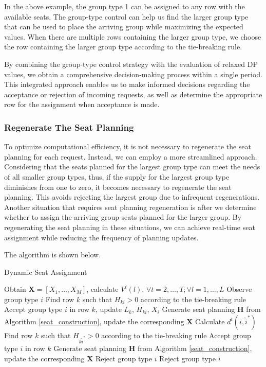 In the above example, the group type 1 can be assigned to any row with the available seats. The group-type control can help us find the larger group type that can be used to place the arriving group while maximizing the expected values. When there are multiple rows containing the larger group type, we choose the row containing the larger group type according to the tie-breaking rule.

By combining the group-type control strategy with the evaluation of relaxed DP values, we obtain a comprehensive decision-making process within a single period. This integrated approach enables us to make informed decisions regarding the acceptance or rejection of incoming requests, as well as determine the appropriate row for the assignment when acceptance is made.

\subsubsection{Regenerate The Seat Planning}
To optimize computational efficiency, it is not necessary to regenerate the seat planning for each request. Instead, we can employ a more streamlined approach. Considering that the seats planned for the largest group type can meet the needs of all smaller group types, thus, if the supply for the largest group type diminishes from one to zero, it becomes necessary to regenerate the seat planning. This avoids rejecting the largest group due to infrequent regenerations. Another situation that requires seat planning regeneration is after we determine whether to assign the arriving group seats planned for the larger group. By regenerating the seat planning in these situations, we can achieve real-time seat assignment while reducing the frequency of planning updates.

The algorithm is shown below.

\begin{algorithm}[H]
  \caption{Dynamic Seat Assignment}
  Obtain $\bm{X} = [X_1, \ldots, X_M]$, calculate $V^{t}(l)$, $\forall t =2, \ldots, T; \forall l = 1, \ldots, L$\;
  {Observe group type ${i}$\;
    {
    {Find row $k$ such that $H_{k{i}} >0$ according to the tie-breaking rule\; 
    Accept group type $i$ in row $k$, update $L_{k}$, $H_{ki}$, $X_{i}$\;
    {Generate seat planning $\bm{H}$ from Algorithm \ref{seat_construction}, update the corresponding $\bm{X}$\;}}
    {Calculate $d^{t}({i}, \hat{i}^{*})$\;
    {Find row $k$ such that $H_{k \hat{i}^{*}} > 0$ according to the tie-breaking rule\;
     Accept group type $i$ in row $k$\;
    Generate seat planning $\bm{H}$ from Algorithm \ref{seat_construction}, update the corresponding $\bm{X}$\;}
    {Reject group type ${i}$\;}}}
    {Reject group type ${i}$\;}}
\end{algorithm}
